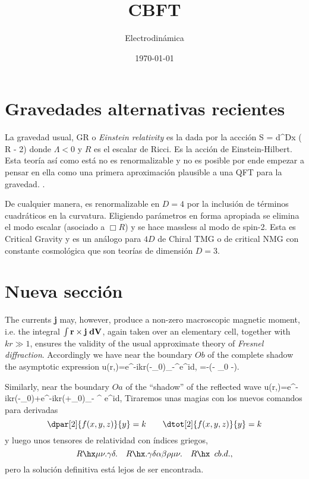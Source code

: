 \documentclass[10pt,oneside]{CBFT_article}
\title{CBFT}
\author{Electrodinámica}
\date{\today}
\begin{document}
\maketitle
\tableofcontents



\section{Gravedades alternativas recientes}
 
La gravedad usual, GR o {\it Einstein relativity} es la dada por la accción
\be
S = \kappa \:\int d^Dx \:\:( R - 2\Lambda)
\ee
donde $\Lambda<0$ y $R$ es el escalar de Ricci. Es la acción de Einstein-Hilbert.
Esta teoría así como está no es renormalizable y no es posible por ende empezar a pensar en ella 
como una primera aproximación plausible a una QFT para la gravedad.
.

De cualquier manera, es renormalizable en $D=4$ por la inclusión de términos cuadráticos en la 
curvatura. 
Eligiendo parámetros en forma apropiada se elimina el modo escalar (asociado a $\Box R$) y se hace 
massless al modo de spin-2. Esta es {Critical Gravity}
y es un análogo para $4D$ de Chiral TMG o de critical NMG con constante cosmológica que son teorías de dimensión $D=3$.

\section{Nueva sección}

The currents {\bf j} may, however, produce a non-zero macroscopic magnetic
moment, i.e. the integral $\int \bf{r\times j}\;dV$, again taken over an elementary cell,
together with $kr\gg1$, ensures the validity of the usual approximate theory of {\it Fresnel
diffraction}. Accordingly we have near the boundary $Ob$ of the complete shadow the
asymptotic expression
\be
u(r,\phi)=e^{-ikr\;\cos(\phi-\phi_0)}\int_{-\infty}^{\omega}e^{i}d\eta,
\ee
\be
\omega=-(\phi - \phi_0 -\pi).
\label{omega}
\ee

Similarly, near the boundary $Oa$ of the ``shadow'' of the reflected wave
\be
u(r,\phi)=e^{-ikr\cos(\phi-\phi_0)}+e^{-ikr\cos(\phi+\phi_0)}\int_{-\infty}
^ { \omega}e^{i}d\eta,
\ee
{}
Tiraremos unas magias con los nuevos comandos para derivadas
\[ \dpar[2]{f(x,y,z)}{y} = k \qquad \dtot[2]{f(x,y,z)}{y} = k\]
y luego unos tensores de relatividad con índices griegos,
\[ R\hx\mu\nu.\gamma\delta. \quad R\hx.\gamma\delta\alpha\beta\rho\mu\nu. 
\quad R\hx\phantom{a}cb.d.,\]
pero la solución definitiva está lejos de ser encontrada. 
\end{document}
